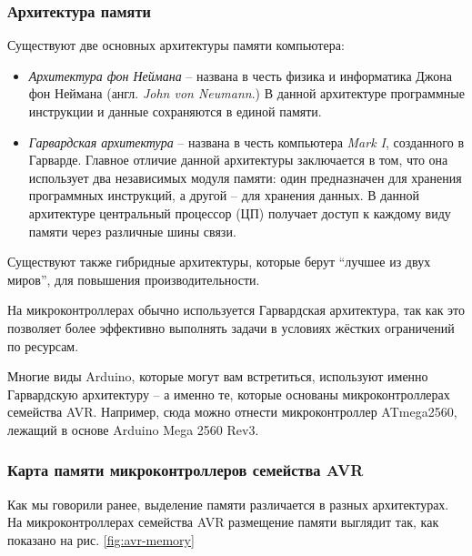 \documentclass[../sparc.tex]{subfiles}
\begin{document}
\subsubsection{Архитектура памяти}

Существуют две основных архитектуры памяти компьютера:
\begin{itemize}
\item \emph{Архитектура фон Неймана} -- названа в честь физика и информатика
  Джона фон Неймана (англ. \textit{John von Neumann}.)  В данной архитектуре
  программные инструкции и данные сохраняются в единой памяти.
\item \emph{Гарвардская архитектура} -- названа в честь компьютера \emph{Mark I},
  созданного в Гарварде.  Главное отличие данной архитектуры заключается в том,
  что она использует два независимых модуля памяти: один предназначен для
  хранения программных инструкций, а другой -- для хранения данных.  В данной
  архитектуре центральный процессор (ЦП) получает доступ к каждому виду памяти
  через различные шины связи.
\end{itemize}

Существуют также гибридные архитектуры, которые берут ``лучшее из двух миров'',
для повышения производительности.

На микроконтроллерах обычно используется Гарвардская архитектура, так как это
позволяет более эффективно выполнять задачи в условиях жёстких ограничений по
ресурсам.

Многие виды Arduino, которые могут вам встретиться, используют именно
Гарвардскую архитектуру -- а именно те, которые основаны микроконтроллерах
семейства AVR.  Например, сюда можно отнести микроконтроллер ATmega2560, лежащий
в основе Arduino Mega 2560 Rev3.\cite{arduino:memory-guide}

\subsubsection{Карта памяти микроконтроллеров семейства AVR}


Как мы говорили ранее, выделение памяти различается в разных архитектурах.  На
микроконтроллерах семейства AVR размещение памяти выглядит так, как показано на
рис. \ref{fig:avr-memory}
\end{document}
